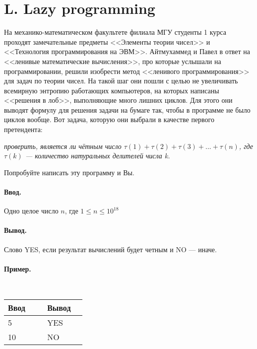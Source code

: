 \documentclass[12pt, a5paper]{article}
\newcommand{\informat}[1]
{
	\paragraph{Ввод.\\} #1
}
\newcommand{\outformat}[1]
{
	\paragraph{Вывод.\\} #1
}
\newcommand{\examplee}[4]
{
	\paragraph{Пример.\\}
	{\tt
	\begin{tabular}{|p{0.4\linewidth}|p{0.4\linewidth}|}
	\hline
	Ввод 	& Вывод  	\\
	\hline
	#1 		& #2 		\\
	\hline
	#3		& #4		\\
	\hline
	\end{tabular}
	}
}
\begin{document}
\section*{L. Lazy programming}

На механико-математическом факультете филиала МГУ студенты 1 курса проходят замечательные предметы <<Элементы теории чисел>> и <<Технология программирования на ЭВМ>>. Айтмухаммед и Павел в ответ на <<ленивые математические вычисления>>, про которые услышали на программировании, решили изобрести метод <<ленивого программирования>> для задач по теории чисел. На такой шаг они пошли с целью не увеличивать всемирную энтропию работающих компьютеров, на которых написаны <<решения в лоб>>, выполняющие много лишних циклов. Для этого они выводят формулу для решения задачи на бумаге так, чтобы в программе не было циклов вообще. Вот задача, которую они выбрали в качестве первого претендента:

\textit{проверить, является ли чётным число $\tau(1) + \tau(2) + \tau(3) + ... + \tau(n)$, \newline где $\tau(k)$ --- количество натуральных делителей числа k.}

Попробуйте написать эту программу и Вы. 

\informat{Одно целое число $n$, где $1 \le n \le 10^{18}$}

\outformat{Слово YES, если результат вычислений будет четным и NO --- иначе.}

\examplee{5}{YES}{10}{NO}
\end{document}
